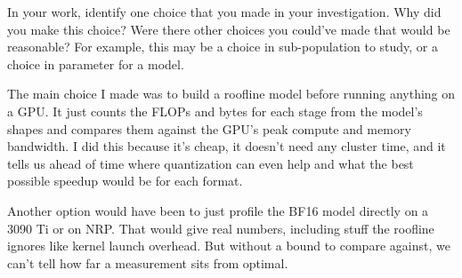 \documentclass{article}
\begin{document}
\begin{probset}
\begin{prob}
    In your work, identify one choice that you made in your investigation. Why did you make this choice? Were there other choices you could've made that would be reasonable? For example, this may be a choice in sub-population to study, or a choice in parameter for a model.

    \begin{soln}
        The main choice I made was to build a roofline model before running anything on a GPU. It just counts the FLOPs and bytes for each stage from the model's shapes and compares them against the GPU's peak compute and memory bandwidth. I did this because it's cheap, it doesn't need any cluster time, and it tells us ahead of time where quantization can even help and what the best possible speedup would be for each format. 
        
        Another option would have been to just profile the BF16 model directly on a 3090 Ti or on NRP. That would give real numbers, including stuff the roofline ignores like kernel launch overhead. But without a bound to compare against, we can't tell how far a measurement sits from optimal.
    \end{soln}
\end{prob}
\end{probset}
\end{document}
